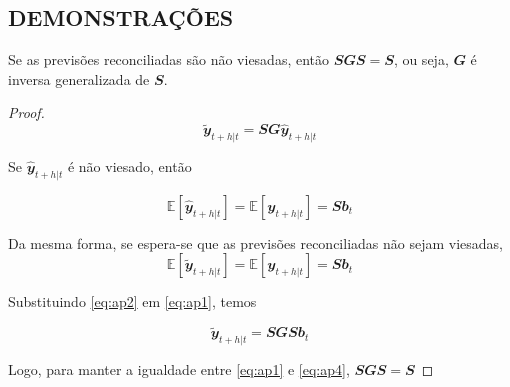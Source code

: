 \postextual

\begin{apendicesenv}
\partapendices

\chapter{DEMONSTRAÇÕES} \label{apendice_a}

\begin{proposition}
  \label{proposicao1}

  Se as previsões reconciliadas são não viesadas, então $\mathbfit{SGS=S}$, ou seja, $\mathbfit{G}$ é inversa generalizada de $\mathbfit{S}$.

\end{proposition}

\begin{proof}
  \begin{equation} \label{eq:ap1}
    \mathbfit{\tilde{y}}_{t+h|t} = \mathbfit{SG\hat{y}}_{t+h|t} 
  \end{equation}

  Se $\mathbfit{\hat{y}}_{t+h|t}$ é não viesado, então 

  \begin{equation} \label{eq:ap2}
      \mathbb{E}[\mathbfit{\hat{y}}_{t+h|t}] = \mathbb{E}[\mathbfit{y}_{t+h|t}] = \mathbfit{Sb}_t
  \end{equation}

  Da mesma forma, se espera-se que as previsões reconciliadas não sejam viesadas,
  \begin{equation} \label{eq:ap3}
      \mathbb{E}[\mathbfit{\tilde{y}}_{t+h|t}] = \mathbb{E}[\mathbfit{y}_{t+h|t}] = \mathbfit{Sb}_t
  \end{equation}

  Substituindo \eqref{eq:ap2} em \eqref{eq:ap1}, temos

  \begin{equation} \label{eq:ap4}
      \mathbfit{\tilde{y}}_{t+h|t} = \mathbfit{SGSb}_t 
  \end{equation}

  Logo, para manter a igualdade entre \eqref{eq:ap1} e \eqref{eq:ap4}, $\mathbfit{SGS=S}$

\end{proof}

\begin{proposition}
  \label{proposicao2}


\end{proposition}
\end{apendicesenv}
